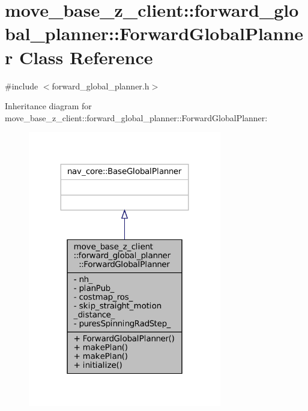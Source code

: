 \hypertarget{classmove__base__z__client_1_1forward__global__planner_1_1ForwardGlobalPlanner}{}\section{move\+\_\+base\+\_\+z\+\_\+client\+:\+:forward\+\_\+global\+\_\+planner\+:\+:Forward\+Global\+Planner Class Reference}
\label{classmove__base__z__client_1_1forward__global__planner_1_1ForwardGlobalPlanner}


{\ttfamily \#include $<$forward\+\_\+global\+\_\+planner.\+h$>$}



Inheritance diagram for move\+\_\+base\+\_\+z\+\_\+client\+:\+:forward\+\_\+global\+\_\+planner\+:\+:Forward\+Global\+Planner\+:
\nopagebreak
\begin{figure}[H]
\begin{center}
\leavevmode
\includegraphics[width=239pt]{classmove__base__z__client_1_1forward__global__planner_1_1ForwardGlobalPlanner__inherit__graph}
\end{center}
\end{figure}


